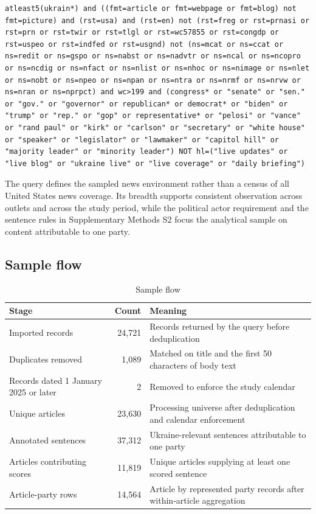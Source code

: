 \begin{lstlisting}
atleast5(ukrain*) and ((fmt=article or fmt=webpage or fmt=blog) not fmt=picture) and (rst=usa) and (rst=en) not (rst=freg or rst=prnasi or rst=prn or rst=twir or rst=tlgl or rst=wc57855 or rst=congdp or rst=uspeo or rst=indfed or rst=usgnd) not (ns=mcat or ns=ccat or ns=redit or ns=gspo or ns=nabst or ns=nadvtr or ns=ncal or ns=ncopro or ns=ncdig or ns=nfact or ns=nlist or ns=nhoc or ns=nimage or ns=nlet or ns=nobt or ns=npeo or ns=npan or ns=ntra or ns=nrmf or ns=nrvw or ns=nran or ns=nprpct) and wc>199 and (congress* or "senate" or "sen." or "gov." or "governor" or republican* or democrat* or "biden" or "trump" or "rep." or "gop" or representative* or "pelosi" or "vance" or "rand paul" or "kirk" or "carlson" or "secretary" or "white house" or "speaker" or "legislator" or "lawmaker" or "capitol hill" or "majority leader" or "minority leader") NOT hl=("live updates" or "live blog" or "ukraine live" or "live coverage" or "daily briefing")
\end{lstlisting}

The query defines the sampled news environment rather than a census of all United States news coverage. Its breadth supports consistent observation across outlets and across the study period, while the political actor requirement and the sentence rules in Supplementary Methods S2 focus the analytical sample on content attributable to one party.

\subsection*{Sample flow}

\begin{table}[htbp]
\centering\small
\caption{Sample flow}
\begin{tabular}{@{}p{}rp{}@{}}
\toprule
\textbf{Stage} & \textbf{Count} & \textbf{Meaning} \\
\midrule
Imported records & 24,721 & Records returned by the query before deduplication \\
Duplicates removed & 1,089 & Matched on title and the first 50 characters of body text \\
Records dated 1 January 2025 or later & 2 & Removed to enforce the study calendar \\
Unique articles & 23,630 & Processing universe after deduplication and calendar enforcement \\
Annotated sentences & 37,312 & Ukraine-relevant sentences attributable to one party \\
Articles contributing scores & 11,819 & Unique articles supplying at least one scored sentence \\
Article-party rows & 14,564 & Article by represented party records after within-article aggregation \\
\bottomrule
\end{tabular}
\end{table}

